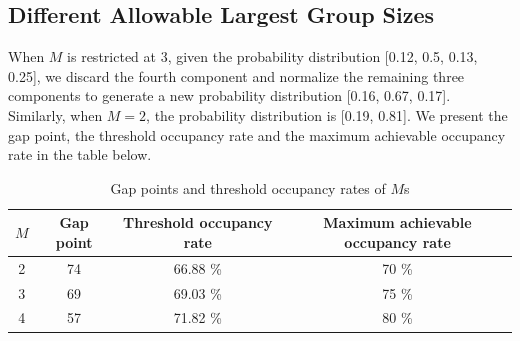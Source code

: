 

\subsection*{Different Allowable Largest Group Sizes}
When $M$ is restricted at 3, given the probability distribution [0.12, 0.5, 0.13, 0.25], we discard the fourth component and normalize the remaining three components to generate a new probability distribution [0.16, 0.67, 0.17]. Similarly, when $M =2$, the probability distribution is [0.19, 0.81].
We present the gap point, the threshold occupancy rate and the maximum achievable occupancy rate in the table below.


\begin{table}[ht]
  \centering
  \caption{Gap points and threshold occupancy rates of $M$s}
  \begin{tabular}{c|ccc}
  \hline
   $M$  & Gap point & Threshold occupancy rate & Maximum achievable occupancy rate \\
  \hline
   2 &  74  & 66.88 \% & 70 \% \\
   3 &  69  & 69.03 \% & 75 \% \\
   4 &  57  & 71.82 \% & 80 \% \\ 
   \hline
  \end{tabular}
\end{table}


